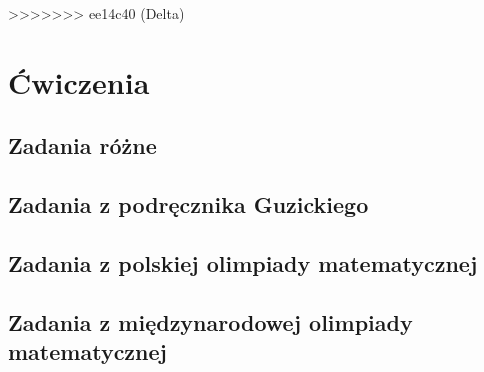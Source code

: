 \documentclass{greaseproof}
\begin{document}
>>>>>>> ee14c40 (Delta)

\chapter{Ćwiczenia}
\section{Zadania różne}


\section{Zadania z podręcznika Guzickiego}


\section{Zadania z polskiej olimpiady matematycznej}


\section{Zadania z międzynarodowej olimpiady matematycznej}


{}


\raggedright
{}
\printindex

\printindex[persons]
\end{document}
